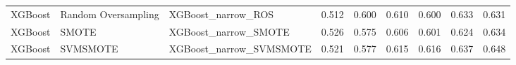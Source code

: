 \begin{tabular}{lllllllll}
                     XGBoost & Random Oversampling &                           XGBoost\_narrow\_ROS & 0.512 &                     0.600 &                 0.610 &                  0.600 &                                   0.633 &     0.631 \\
                     XGBoost &               SMOTE &                         XGBoost\_narrow\_SMOTE & 0.526 &                     0.575 &                 0.606 &                  0.601 &                                   0.624 &     0.634 \\
                     XGBoost &            SVMSMOTE &                      XGBoost\_narrow\_SVMSMOTE & 0.521 &                     0.577 &                 0.615 &                  0.616 &                                   0.637 &     0.648 \\
\bottomrule
\end{tabular}
